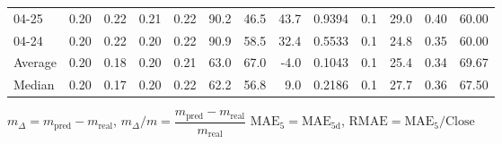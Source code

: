 \begin{threeparttable}
{\begin{tabular}{lrrrrrrrrrrrr}
  04-25 &          0.20 &          0.22 &          0.21 &        0.22 &                90.2 &                46.5 &       43.7 &       0.9394 &                 0.1 &             29.0 &            0.40 &                  60.00 \\
  04-24 &          0.20 &          0.22 &          0.20 &        0.22 &                90.9 &                58.5 &       32.4 &       0.5533 &                 0.1 &             24.8 &            0.35 &                  60.00 \\
Average &          0.20 &          0.18 &          0.20 &        0.21 &                63.0 &                67.0 &       -4.0 &       0.1043 &                 0.1 &             25.4 &            0.34 &                  69.67 \\
 Median &          0.20 &          0.17 &          0.20 &        0.22 &                62.2 &                56.8 &        9.0 &       0.2186 &                 0.1 &             27.7 &            0.36 &                  67.50 \\
\bottomrule
\end{tabular}
}
\begin{tablenotes}\footnotesize
\item $m_\Delta=m_{\text{pred}}-m_{\text{real}}$,
$m_\Delta/m=\dfrac{m_{\text{pred}}-m_{\text{real}}}{m_{\text{real}}}$
$\mathrm{MAE}_5=\mathrm{MAE}_{5\text{d}}$,
$\mathrm{RMAE}=\mathrm{MAE}_5/\text{Close}$
\end{tablenotes}
\end{threeparttable}
\endgroup

